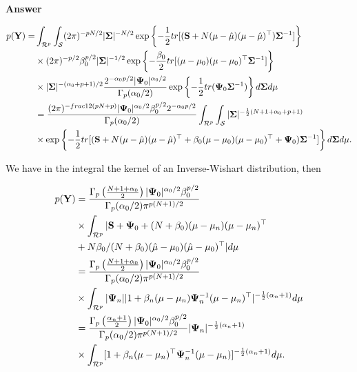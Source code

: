\begin{enumerate}[leftmargin=*]
\textbf{Answer}

\begin{align*}
	p({\bf{Y}})=&\int_{\mathcal{R}^p}\int_{\mathcal{S}}(2\pi)^{-pN/2}|\mathbf{\Sigma}|^{-N/2}\exp\left\{-\frac{1}{2}tr[({\bf{S}}+N(\mu-\hat{\mu})(\mu-\hat{\mu})^{\top})\mathbf{\Sigma}^{-1}]\right\}\\
	&\times (2\pi)^{-p/2}\beta_0^{p/2}|\mathbf{\Sigma}|^{-1/2}\exp\left\{-\frac{\beta_0}{2}tr[(\mu-\mu_0)(\mu-\mu_0)^{\top}\mathbf{\Sigma}^{-1}]\right\}\\
	&\times |\mathbf{\Sigma}|^{-(\alpha_0+p+1)/2}\frac{2^{-\alpha_0p/2}|\mathbf{\Psi}_0|^{\alpha_0/2}}{\Gamma_p(\alpha_0/2)}\exp\left\{-\frac{1}{2}tr(\mathbf{\Psi}_0\mathbf{\Sigma}^{-1})\right\}d\mathbf{\Sigma} d\mu\\
	&=\frac{(2\pi)^{-frac{1}{2}(pN+p)}|\mathbf{\Psi}_0|^{\alpha_0/2}\beta_0^{p/2}2^{-\alpha_0p/2}}{\Gamma_p(\alpha_0/2)}\int_{\mathcal{R}^p}\int_{\mathcal{S}} |\mathbf{\Sigma}|^{-\frac{1}{2}(N+1+\alpha_0+p+1)}\\
	&\times \exp\left\{-\frac{1}{2}tr[({\bf{S}}+N(\mu-\hat{\mu})(\mu-\hat{\mu})^{\top}+\beta_0(\mu-\mu_0)(\mu-\mu_0)^{\top}+\mathbf{\Psi}_0)\mathbf{\Sigma}^{-1}]\right\}d\mathbf{\Sigma} d\mu.
\end{align*}

We have in the integral the kernel of an Inverse-Wishart distribution, then

\begin{align*}
p({\bf{Y}})	&=\frac{\Gamma_p\left(\frac{N+1+\alpha_0}{2}\right)|\mathbf{\Psi}_0|^{\alpha_0/2}\beta_0^{p/2}}{\Gamma_p(\alpha_0/2)\pi^{p(N+1)/2}}\\
	&\times\int_{\mathcal{R}^p} |{\bf{S}}+\mathbf{\Psi}_0+(N+\beta_0)(\mu-\mu_n)(\mu-\mu_n)^{\top}\\
	&+N\beta_0/(N+\beta_0)(\hat{\mu}-\mu_0)(\hat{\mu}-\mu_0)^{\top}| d\mu\\
	&=\frac{\Gamma_p\left(\frac{N+1+\alpha_0}{2}\right)|\mathbf{\Psi}_0|^{\alpha_0/2}\beta_0^{p/2}}{\Gamma_p(\alpha_0/2)\pi^{p(N+1)/2}}\\
	&\times\int_{\mathcal{R}^p} |\mathbf{\Psi}_n||1+\beta_n(\mu-\mu_n)\mathbf{\Psi}_n^{-1}(\mu-\mu_n)^{\top}|^{-\frac{1}{2}(\alpha_n+1)} d\mu\\
	&=\frac{\Gamma_p\left(\frac{\alpha_n+1}{2}\right)|\mathbf{\Psi}_0|^{\alpha_0/2}\beta_0^{p/2}}{\Gamma_p(\alpha_0/2)\pi^{p(N+1)/2}}|\mathbf{\Psi}_n|^{-\frac{1}{2}(\alpha_n+1)}\\
	&\times\int_{\mathcal{R}^p} [1+\beta_n(\mu-\mu_n)^{\top}\mathbf{\Psi}_n^{-1}(\mu-\mu_n)]^{-\frac{1}{2}(\alpha_n+1)} d\mu.
\end{align*} 


\end{enumerate}

